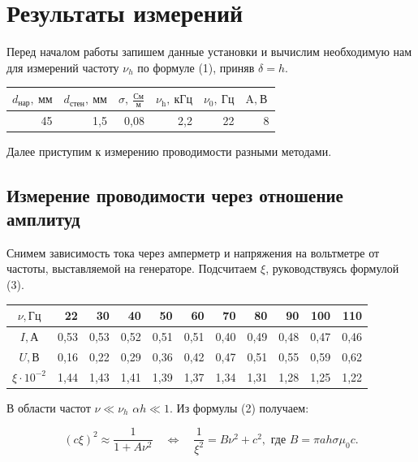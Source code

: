 \documentclass[14pt,a4paper]{article}
\begin{document}
\section*{Результаты измерений}

Перед началом работы запишем данные установки и вычислим необходимую нам для измерений частоту $\nu_h$ по формуле (1), приняв $\delta = h$.

\begin{table}[!ht]
\centering
    \begin{tabular}{|r|r|r|r|r|r|}
    \hline
        $d_{\text{нар}}, \ \text{мм}$  & $d_{\text{стен}}, \ \text{мм}$ & $\sigma, \  \frac{\text{См}}{\text{м}}$ & $\nu_{\text{h}}, \ \text{кГц} $ & $\nu_0, \ \text{Гц}$ & $\text{A}, \ \text{В}$ \\ \hline
        45 & 1,5 & 0,08 & 2,2 & 22 & 8 \\ \hline
    \end{tabular}
\end{table}
Далее приступим к измерению проводимости разными методами.
\subsection*{Измерение проводимости через отношение амплитуд}
Снимем зависимость тока через амперметр и напряжения на вольтметре от частоты, выставляемой на генераторе. Подсчитаем $\xi$, руководствуясь формулой (3).

\begin{table}[!ht]
    \centering
    \begin{tabular}{|c|r|r|r|r|r|r|r|r|r|r|}
    \hline
        $\nu, \text{Гц}$ & 22 & 30 & 40 & 50 & 60 & 70 & 80 & 90 & 100 & 110 \\ \hline
        $I, \text{А}$ & 0,53 & 0,53 & 0,52 & 0,51 & 0,51 & 0,40 & 0,49 & 0,48 & 0,47 & 0,46 \\ \hline
        $U, \text{В}$ & 0,16 & 0,22 & 0,29 & 0,36 & 0,42 & 0,47 & 0,51 & 0,55 & 0,59 & 0,62 \\ \hline
        $\xi \cdot 10^{-2}$ & 1,44 & 1,43 & 1,41 & 1,39 & 1,37 & 1,34 & 1,31 & 1,28 & 1,25 & 1,22 \\ \hline
    \end{tabular}
\end{table}

В области частот $\nu \ll \nu_h$ $\alpha h \ll 1$. Из формулы (2) получаем:

\[ (c\xi)^2 \approx \frac{1}{1+A\nu^2} \quad \Leftrightarrow \quad  \frac{1}{\xi^2}=B\nu^2 + c^2, \text{ где } B=\pi a h \sigma \mu_0 c. \]
\end{document}
